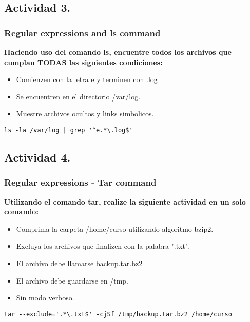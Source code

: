 \documentclass[a4paper,11pt,spanish]{article} %
\begin{document}
\subsection{Actividad 3.}

\subsubsection{Regular expressions and ls command}

\textbf{Haciendo uso del comando ls, encuentre todos los archivos que cumplan TODAS las siguientes condiciones:}

\begin{itemize}
 \item Comienzen con la letra e y terminen con .log
 \item Se encuentren en el directorio /var/log.
 \item Muestre archivos ocultos y links simbolicos.
\end{itemize}

\begin{verbatim}
ls -la /var/log | grep '^e.*\.log$'
\end{verbatim}

\subsection{Actividad 4.}

\subsubsection{Regular expressions - Tar command}

\textbf{Utilizando el comando tar, realize la siguiente actividad en un solo comando:}

\begin{itemize}
 \item Comprima la carpeta /home/curso utilizando algoritmo bzip2.
 \item Excluya los archivos que finalizen con la palabra ".txt".
 \item El archivo debe llamarse backup.tar.bz2
 \item El archivo debe guardarse en /tmp.
 \item Sin modo verboso.
 \end{itemize}

\begin{verbatim}
tar --exclude='.*\.txt$' -cjSf /tmp/backup.tar.bz2 /home/curso
\end{verbatim}
\end{document}
